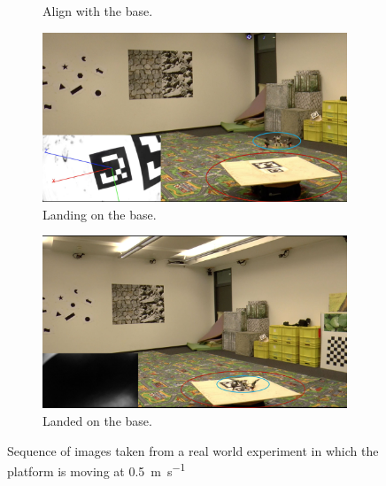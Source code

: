 \begin{figure}[!htbp]
\begin{subfigure}[b]{0.5\textwidth}
        \caption{Align with the base.}
        \label{fig:three}
   \end{subfigure}
    \begin{subfigure}[b]{0.5\textwidth}
        \includegraphics[width=\textwidth]{img/landing2.jpg}
        \caption{Landing on the base.}
        \label{fig:four}
   \end{subfigure} 
    \begin{subfigure}[b]{0.5\textwidth}
        \includegraphics[width=\textwidth]{img/landed2.jpg}
        \caption{Landed on the base.}
        \label{fig:five}
   \end{subfigure}
   
  \caption{Sequence of images taken from a real world experiment in which the platform is moving at \SI{0.5}{\meter \per \second} }
  \label{fig:landing2}
\end{figure} 

